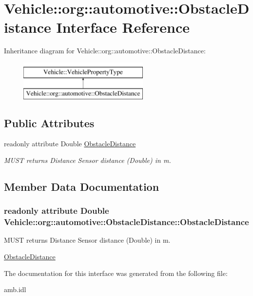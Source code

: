 \hypertarget{interfaceVehicle_1_1org_1_1automotive_1_1ObstacleDistance}{\section{Vehicle\-:\-:org\-:\-:automotive\-:\-:Obstacle\-Distance Interface Reference}
\label{interfaceVehicle_1_1org_1_1automotive_1_1ObstacleDistance}
}
Inheritance diagram for Vehicle\-:\-:org\-:\-:automotive\-:\-:Obstacle\-Distance\-:\begin{figure}[H]
\begin{center}
\leavevmode
\includegraphics[height=2.000000cm]{interfaceVehicle_1_1org_1_1automotive_1_1ObstacleDistance}
\end{center}
\end{figure}
\subsection*{Public Attributes}
\begin{DoxyCompactItemize}
\item 
readonly attribute Double \hyperlink{interfaceVehicle_1_1org_1_1automotive_1_1ObstacleDistance_a3f478ce6e27a03a9bcff97c37781d483}{Obstacle\-Distance}
\begin{DoxyCompactList}\small\item\em M\-U\-S\-T returns Distance Sensor distance (Double) in m. \end{DoxyCompactList}\end{DoxyCompactItemize}


\subsection{Member Data Documentation}
\hypertarget{interfaceVehicle_1_1org_1_1automotive_1_1ObstacleDistance_a3f478ce6e27a03a9bcff97c37781d483}{
\subsubsection[{Obstacle\-Distance}]{\setlength{\rightskip}{0pt plus 5cm}readonly attribute Double Vehicle\-::org\-::automotive\-::\-Obstacle\-Distance\-::\-Obstacle\-Distance}}\label{interfaceVehicle_1_1org_1_1automotive_1_1ObstacleDistance_a3f478ce6e27a03a9bcff97c37781d483}


M\-U\-S\-T returns Distance Sensor distance (Double) in m. 

\hyperlink{interfaceVehicle_1_1org_1_1automotive_1_1ObstacleDistance}{Obstacle\-Distance} 

The documentation for this interface was generated from the following file\-:\begin{DoxyCompactItemize}
\item 
amb.\-idl\end{DoxyCompactItemize}
